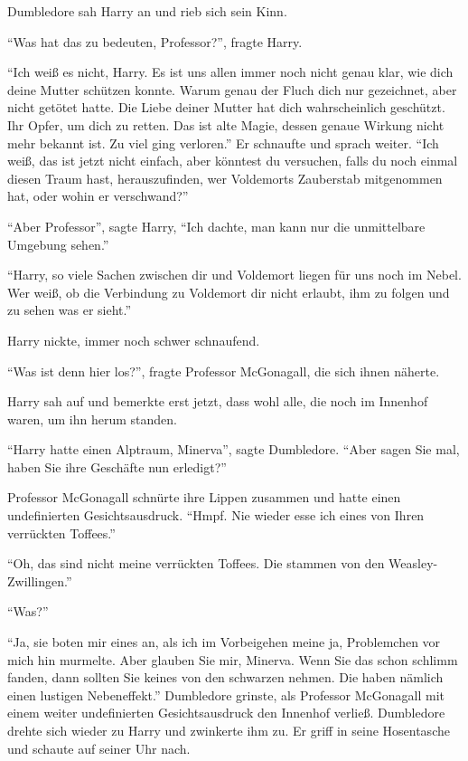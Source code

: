 Dumbledore sah Harry an und rieb sich sein Kinn.

\enquote{Was hat das zu bedeuten, Professor?}, fragte Harry.

\enquote{Ich weiß es nicht, Harry. Es ist uns allen immer noch nicht genau klar, wie dich deine Mutter schützen konnte. Warum genau der Fluch dich nur gezeichnet, aber nicht getötet hatte. Die Liebe deiner Mutter hat dich wahrscheinlich geschützt. Ihr Opfer, um dich zu retten. Das ist alte Magie, dessen genaue Wirkung nicht mehr bekannt ist. Zu viel ging verloren.} Er schnaufte und sprach weiter. \enquote{Ich weiß, das ist jetzt nicht einfach, aber könntest du versuchen, falls du noch einmal diesen Traum hast, herauszufinden, wer Voldemorts Zauberstab mitgenommen hat, oder wohin er verschwand?}

\enquote{Aber Professor}, sagte Harry, \enquote{Ich dachte, man kann nur die unmittelbare Umgebung sehen.}

\enquote{Harry, so viele Sachen zwischen dir und Voldemort liegen für uns noch im Nebel. Wer weiß, ob die Verbindung zu Voldemort dir nicht erlaubt, ihm zu folgen und zu sehen was er sieht.}

Harry nickte, immer noch schwer schnaufend.

\enquote{Was ist denn hier los?}, fragte Professor McGonagall, die sich ihnen näherte.

Harry sah auf und bemerkte erst jetzt, dass wohl alle, die noch im Innenhof waren, um ihn herum standen.

\enquote{Harry hatte einen Alptraum, Minerva}, sagte Dumbledore. \enquote{Aber sagen Sie mal, haben Sie ihre Geschäfte nun erledigt?}

Professor McGonagall schnürte ihre Lippen zusammen und hatte einen undefinierten Gesichtsausdruck. \enquote{Hmpf. Nie wieder esse ich eines von Ihren verrückten Toffees.}

\enquote{Oh, das sind nicht meine verrückten Toffees. Die stammen von den Weas\-ley-Zwillingen.}

\enquote{Was?}

\enquote{Ja, sie boten mir eines an, als ich im Vorbeigehen meine \gst ja, Problemchen vor mich hin murmelte. Aber glauben Sie mir, Minerva. Wenn Sie das schon schlimm fanden, dann sollten Sie keines von den schwarzen nehmen. Die haben nämlich einen lustigen Nebeneffekt.} Dumbledore grinste, als Professor McGonagall mit einem weiter undefinierten Gesichtsausdruck den Innenhof verließ. Dumbledore drehte sich wieder zu Harry und zwinkerte ihm zu. Er griff in seine Hosentasche und schaute auf seiner Uhr nach.

